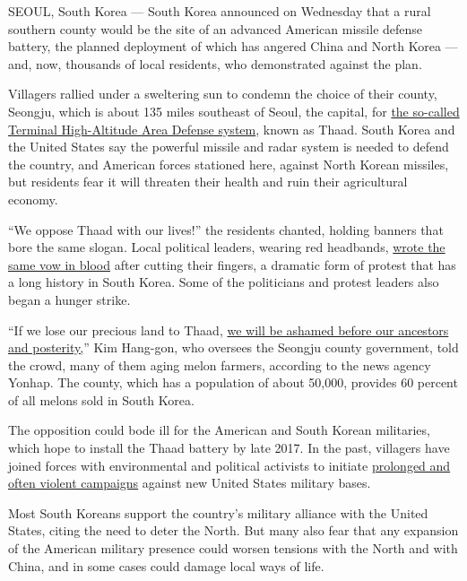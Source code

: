 SEOUL, South Korea --- South Korea announced on Wednesday that a rural
southern county would be the site of an advanced American missile
defense battery, the planned deployment of which has angered China and
North Korea --- and, now, thousands of local residents, who demonstrated
against the plan.

Villagers rallied under a sweltering sun to condemn the choice of their
county, Seongju, which is about 135 miles southeast of Seoul, the
capital, for
\href{http://www.nytimes3xbfgragh.onion/2016/07/08/world/asia/south-korea-and-us-agree-to-deploy-missile-defense-system.html}{the
so-called Terminal High-Altitude Area Defense system}, known as Thaad.
South Korea and the United States say the powerful missile and radar
system is needed to defend the country, and American forces stationed
here, against North Korean missiles, but residents fear it will threaten
their health and ruin their agricultural economy.

``We oppose Thaad with our lives!'' the residents chanted, holding
banners that bore the same slogan. Local political leaders, wearing red
headbands,
\href{http://www.yonhapnews.co.kr/society/2016/07/13/0701000000AKR20160713113900053.HTML?template=2087}{wrote
the same vow in blood} after cutting their fingers, a dramatic form of
protest that has a long history in South Korea. Some of the politicians
and protest leaders also began a hunger strike.

``If we lose our precious land to Thaad,
\href{http://www.yonhapnews.co.kr/society/2016/07/13/0701000000AKR20160713113900053.HTML?template=2087}{we
will be ashamed before our ancestors and posterity,}'' Kim Hang-gon, who
oversees the Seongju county government, told the crowd, many of them
aging melon farmers, according to the news agency Yonhap. The county,
which has a population of about 50,000, provides 60 percent of all
melons sold in South Korea.

The opposition could bode ill for the American and South Korean
militaries, which hope to install the Thaad battery by late 2017. In the
past, villagers have joined forces with environmental and political
activists to initiate
\href{http://www.nytimes3xbfgragh.onion/2006/05/04/world/asia/04iht-korea.html}{prolonged
and often violent campaigns} against new United States military bases.

Most South Koreans support the country's military alliance with the
United States, citing the need to deter the North. But many also fear
that any expansion of the American military presence could worsen
tensions with the North and with China, and in some cases could damage
local ways of life.

